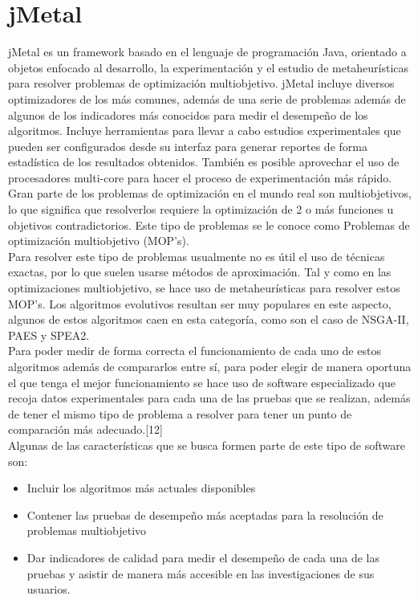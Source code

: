 \section{jMetal}

jMetal es un framework basado en el lenguaje de programación Java, orientado a objetos enfocado al desarrollo, la experimentación y el estudio de metaheurísticas para resolver problemas de optimización multiobjetivo. jMetal incluye diversos optimizadores de los más comunes, además de una serie de problemas además de algunos de los indicadores más conocidos para medir el desempeño de los algoritmos. Incluye herramientas para llevar a cabo estudios experimentales que pueden ser configurados desde su interfaz para generar reportes de forma estadística de los resultados obtenidos. También es posible  aprovechar el uso de procesadores multi-core para hacer el proceso de experimentación más rápido.\\

Gran parte de los problemas de optimización en el mundo real son multiobjetivos, lo que significa que resolverlos requiere la optimización de 2 o más funciones u objetivos contradictorios. Este tipo de problemas se le conoce como Problemas de optimización multiobjetivo (MOP's).\\

Para resolver este tipo de problemas usualmente no es útil el uso de técnicas exactas, por lo que suelen usarse métodos de aproximación. Tal y como en las optimizaciones multiobjetivo, se hace uso de metaheurísticas para resolver estos MOP's. Los algoritmos evolutivos resultan ser muy populares en este aspecto, algunos de estos algoritmos caen en esta categoría, como son el caso de NSGA-II, PAES y SPEA2.\\

Para poder medir de forma correcta el funcionamiento de cada uno de estos algoritmos además de compararlos entre sí, para poder elegir de manera oportuna el que tenga el mejor funcionamiento se hace uso de software especializado que recoja datos experimentales para cada una de las pruebas que se realizan, además de tener el mismo tipo de problema a resolver para tener un punto de comparación más adecuado.[12]\\

Algunas de las características que se busca formen parte de este tipo de software son:

\begin{itemize}
\item Incluir los algoritmos más actuales disponibles
\item Contener las pruebas de desempeño más aceptadas para la resolución de problemas multiobjetivo
\item Dar indicadores de calidad para medir el desempeño de cada una de las pruebas y asistir de manera más accesible en las investigaciones de sus usuarios.
\end{itemize}

